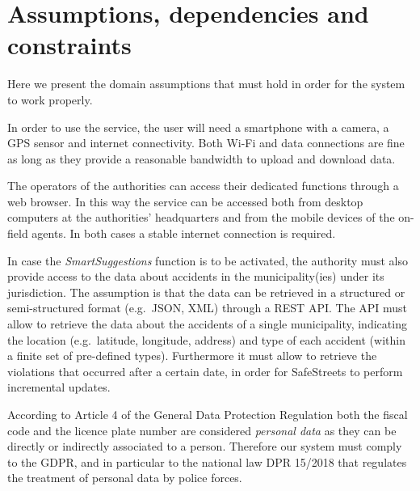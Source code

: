 \section{Assumptions, dependencies and constraints}
\label{sec:ass_deps_constr}

Here we present the domain assumptions that must hold in order for the system
to work properly.
\begin{description}
\end{description}

In order to use the service, the user will need a smartphone with a camera,
a GPS sensor and internet connectivity. Both Wi-Fi and data connections are fine
as long as they provide a reasonable bandwidth to upload and download data.

The operators of the authorities can access their dedicated functions through
a web browser. In this way the service can be accessed both from desktop
computers at the authorities' headquarters and from the mobile devices of the
on-field agents. In both cases a stable internet connection is required.

In case the \emph{SmartSuggestions} function is to be activated, the authority
must also provide access to the data about accidents in the municipality(ies)
under its jurisdiction.
The assumption is that the data can be retrieved in a structured or
semi-structured format (e.g.\ JSON, XML) through a REST API.
The API must allow to retrieve the data about the accidents of a single
municipality, indicating the location (e.g.\ latitude, longitude, address) and
type of each accident (within a finite set of pre-defined types).
Furthermore it must allow to retrieve the violations that occurred after a
certain date, in order for SafeStreets to perform incremental updates.

According to Article 4 of the General Data Protection Regulation
\cite{gdpr:article-4-definitions} both the fiscal code and the licence plate
number are considered \emph{personal data} as they can be directly or indirectly
associated to a person. Therefore our system must comply to the GDPR, and in
particular to the national law DPR 15/2018 \cite{gu:dpr-15/2018} that regulates
the treatment of personal data by police forces.
